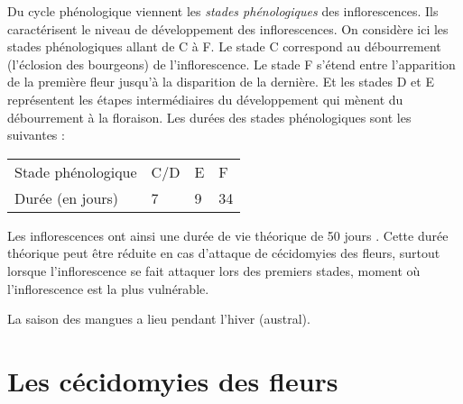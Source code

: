 Du cycle phénologique viennent les \emph{stades phénologiques} des inflorescences.
Ils caractérisent le niveau de développement des inflorescences.
On considère ici les stades phénologiques allant de C à F.
Le stade C correspond au débourrement (l'éclosion des bourgeons) de l'inflorescence.
Le stade F s'étend entre l'apparition de la première fleur jusqu'à la disparition de la dernière.
Et les stades D et E représentent les étapes intermédiaires du développement qui mènent du débourrement à la floraison.
Les durées des stades phénologiques sont les suivantes :
\begin{center}
\begin{tabular}{llll}
Stade phénologique & C/D & E & F\\
Durée (en jours) & 7 & 9 & 34
\end{tabular}
\end{center}
Les inflorescences ont ainsi une durée de vie théorique de 50 jours \citep{laurie}. Cette durée théorique peut être réduite en cas d'attaque de cécidomyies des fleurs, surtout lorsque l'inflorescence se fait attaquer lors des premiers stades, moment où l'inflorescence est la plus vulnérable.

La saison des mangues a lieu pendant l'hiver (austral).







\section{Les cécidomyies des fleurs}
